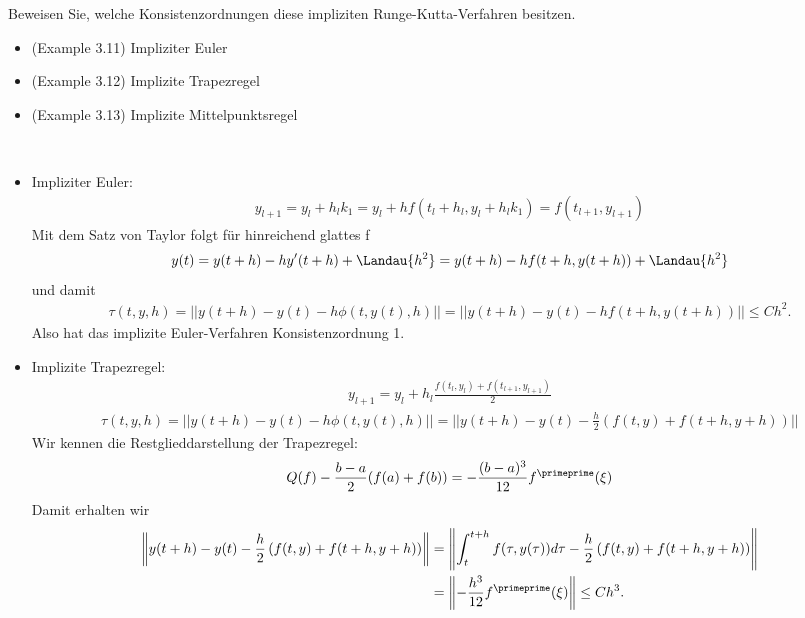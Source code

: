 \begin{exercise}
Beweisen Sie, welche Konsistenzordnungen diese impliziten Runge-Kutta-Verfahren besitzen.
\begin{itemize}
  \item (Example 3.11) Impliziter Euler
  \item (Example 3.12) Implizite Trapezregel
  \item (Example 3.13) Implizite Mittelpunktsregel
\end{itemize}
\end{exercise}
\begin{solution}
\leavevmode \\
\begin{itemize}
  \item Impliziter Euler:
  \begin{align*}
    y_{l+1} = y_l + h_lk_1 = y_l + hf(t_l+h_l,y_l+h_lk_1) = f(t_{l+1},y_{l+1})
  \end{align*}
  Mit dem Satz von Taylor folgt für hinreichend glattes f
  \begin{align*}
    y(t) = y(t+h) - hy^{\prime}(t+h) + \Landau{h^2} =
    y(t+h) - hf(t+h,y(t+h)) + \Landau{h^2}
  \end{align*}
  und damit
  \begin{align*}
    \tau(t,y,h) = ||y(t+h) - y(t) - h\phi(t,y(t),h)|| =
    ||y(t+h) - y(t) - hf(t + h,y(t+h))|| \leq Ch^2.
  \end{align*}
  Also hat das implizite Euler-Verfahren Konsistenzordnung 1.
  \item Implizite Trapezregel:
  \begin{align*}
    y_{l+1} = y_l + h_l\frac{f(t_l,y_l) + f(t_{l+1},y_{l+1})}{2}
  \end{align*}
  \begin{align*}
    \tau(t,y,h) = ||y(t+h) - y(t) - h\phi(t,y(t),h)|| =
    ||y(t+h) - y(t) - \frac{h}{2}\left(f(t,y) + f(t+h,y+h)\right)||
  \end{align*}
  Wir kennen die Restglieddarstellung der Trapezregel:
  \begin{align*}
    Q(f) - \frac{b-a}{2}(f(a)+f(b)) = -\frac{(b-a)^3}{12}f^{\primeprime}(\xi)
  \end{align*}
  Damit erhalten wir
  \begin{align*}
  \left\|y(t+h) - y(t) - \frac{h}{2}\left(f(t,y) + f(t+h,y+h)\right)\right\|
  &= \left\|\int_{t}^{t+h}f(\tau,y(\tau))d\tau - \frac{h}{2}\left(f(t,y) + f(t+h,y+h)\right)\right\| \\
  &= \left\|-\frac{h^3}{12}f^{\primeprime}(\xi)\right\| \leq Ch^3.

\end{align*}
\end{itemize}
\end{solution}
